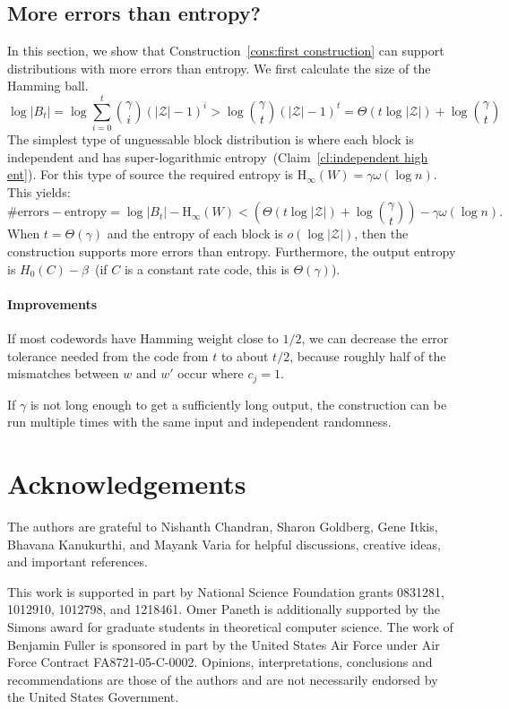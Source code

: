 \documentclass[11pt]{article}
\newcommand{\clref}[1]{\mbox{Claim~\ref{#1}}}
\newcommand{\consref}[1]{\mbox{Construction~\ref{#1}}}
\newcommand{\Hoo}{\mathrm{H}_\infty}
\newcommand{\blind}[1]{{#1}}
\newcommand{\blind}[1]{}
\begin{document}
\subsection{More errors than entropy?}
\label{sec:discussion}
In this section, we show that \consref{cons:first construction} can support distributions with more errors than entropy.
We first calculate the size of the Hamming ball.  
\[
\log |B_t| = \log \sum_{i=0}^t {\gamma \choose i} (|\mathcal{Z}|-1)^i> \log {\gamma \choose t} (|\mathcal{Z}|-1)^t =\Theta(t\log |\mathcal{Z}|) + \log {\gamma\choose t}
\]
The simplest type of unguessable block distribution is where each block is independent and has super-logarithmic entropy~(\clref{cl:independent high ent}).  For this type of source the required entropy is $\Hoo(W) = \gamma\omega(\log n)$.  This yields:
\[
\text{\# errors} - \text{entropy} = \log |B_t| -  \Hoo(W)  <\left( \Theta(t\log |\mathcal{Z}|) + \log {\gamma \choose t}\right) -  \gamma \omega(\log n) .
\]
When $t =\Theta(\gamma)$ and the entropy of each block is $o(\log |\mathcal{Z}|)$, then the construction supports more errors than entropy. Furthermore, the output entropy is $H_0(C) -\beta$~(if $C$ is a constant rate code, this is $\Theta(\gamma)$).

\paragraph{Improvements}  If most codewords have Hamming weight close to $1/2$, we can decrease the error tolerance needed from the code from $t$ to  about $t/2$, because roughly half of the mismatches between $w$ and $w'$ occur where $c_j =1$. 

If $\gamma$ is not long enough to get a sufficiently long output, the construction can be run multiple times with the same input and independent randomness. 

\blind{
\section*{Acknowledgements}
The authors are grateful to Nishanth Chandran, Sharon Goldberg, Gene Itkis, Bhavana Kanukurthi, and Mayank Varia for helpful discussions, creative ideas, and important references.

This work is supported in part by National Science Foundation grants 0831281, 1012910, 1012798, and 1218461. 
Omer Paneth is additionally supported by the Simons award for graduate students in theoretical computer science.
The work of Benjamin Fuller is sponsored in part by the United States Air Force under Air Force Contract FA8721-05-C-0002. Opinions, interpretations, conclusions and recommendations are those of the authors and are not necessarily endorsed by the United States Government.
}


\end{document}
